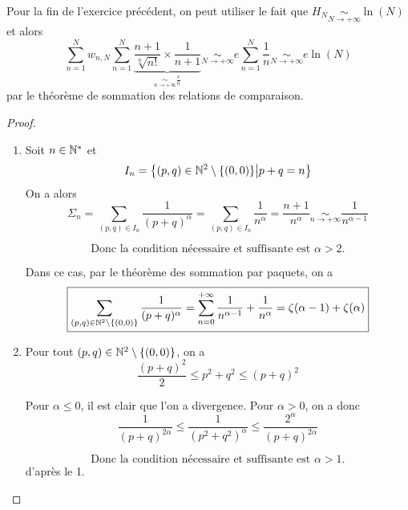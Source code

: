 \begin{remark}
	Pour la fin de l'exercice précédent, on peut utiliser le fait que $H_{N}\underset{N\to+\infty}{\sim}\ln(N)$ et alors 
	$$\sum_{n=1}^{N}w_{n,N}\sum_{n=1}^{N}\underbrace{\frac{n+1}{\sqrt[n]{n!}}\times\frac{1}{n+1}}_{\underset{n\to+\infty}{\sim}\frac{e}{n}}\underset{N\to+\infty}{\sim}e\sum_{n=1}^{N}\frac{1}{n}\underset{N\to+\infty}{\sim}e\ln(N)$$
	par le théorème de sommation des relations de comparaison.
\end{remark}

\begin{proof}
	\phantom{}
	\begin{enumerate}
		\item Soit $n\in\mathbb{N}^{*}$ et 
		$$I_{n}=\left\{(p,q)\in\mathbb{N}^{2}\setminus\{(0,0)\}\middle| p+q=n\right\}$$
		On a alors 
		$$\Sigma_{n}=\sum_{(p,q)\in I_{n}}\frac{1}{(p+q)^{\alpha}}=\sum_{(p,q)\in I_{n}}\frac{1}{n^{\alpha}}=\frac{n+1}{n^{\alpha}}\underset{n\to+\infty}{\sim}\frac{1}{n^{\alpha-1}}$$

		$$\boxed{\text{Donc la condition nécessaire et suffisante est }\alpha>2\text{.}}$$

		Dans ce cas, par le théorème des sommation par paquets, on a 
		$$\boxed{\sum_{(p,q)\in\mathbb{N}^{2}\setminus\{(0,0)\}}\frac{1}{(p+q)^{\alpha}}=\sum_{n=0}^{+\infty}\frac{1}{n^{\alpha-1}}+\frac{1}{n^{\alpha}}=\zeta(\alpha-1)+\zeta(\alpha)}$$

		\item Pour tout $(p,q)\in\mathbb{N}^{2}\setminus\{(0,0)\}$, on a 
		$$\frac{(p+q)^{2}}{2}\leqslant p^{2}+q^{2}\leqslant (p+q)^{2}$$

		Pour $\alpha\leqslant0$, il est clair que l'on a divergence. Pour $\alpha>0$, on a donc 
		$$\frac{1}{(p+q)^{2\alpha}}\leqslant\frac{1}{(p^{2}+q^{2})^{\alpha}}\leqslant\frac{2^{\alpha}}{(p+q)^{2\alpha}}$$
		
		$$\boxed{\text{Donc la condition nécessaire et suffisante est }\alpha>1\text{.}}$$
		d'après le 1.
	\end{enumerate}
\end{proof}

